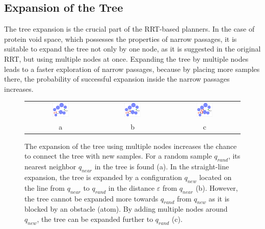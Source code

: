 \documentclass[usletter, 10pt, conference]{svjour3}      %
\def\qrand{q_{rand}}
\def\qnear{q_{near}}
\def\qnew{q_{new}}
\begin{document}
\subsection{Expansion of the Tree}

The tree expansion is the crucial part of the RRT-based planners.
In the case of protein void space, which possesses the properties of narrow passages, it is suitable to expand the tree not only by one node, as it is suggested in the original RRT, but using multiple nodes at once.
Expanding the tree by multiple nodes leads to a faster exploration of narrow passages, because by placing more samples there, the probability of successful expansion inside the narrow passages increases.

\begin{figure}
\centering
{
\renewcommand{\tabcolsep}{3pt}
\begin{tabular}{ccc}
\includegraphics[width=0.25\textwidth]{fig/blosexp} &
\includegraphics[width=0.25\textwidth]{fig/blosexp2} & 
\includegraphics[width=0.25\textwidth]{fig/blosexp3} \\
a & b & c
\end{tabular}
}
\caption{\label{fig::blossom}
    The expansion of the tree using multiple nodes increases the chance to connect the tree with new samples.
For a random sample $\qrand$, its nearest neighbor $\qnear$ in the tree is found (a).
In the straight-line expansion, the tree is expanded by a configuration $\qnew$ located on the line from  $\qnear$ to $\qrand$ in the distance $\varepsilon$ from $\qnear$ (b).
However, the tree cannot be expanded more towards $\qrand$ from $\qnew$ as it is blocked by an obstacle (atom).
By adding multiple nodes around $\qnew$, the tree can be expanded further to $\qrand$ (c).
}
\end{figure}
\end{document}
